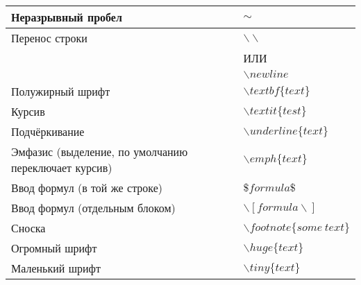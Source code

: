 \documentclass[12pt]{article}
\begin{document}
\begin{center}
\begin{tabular}{ || l | l || }
    Неразрывный пробел &
    $\sim$ \\ \hline

    Перенос строки &
    $\backslash \backslash$ \\ &
    ИЛИ \\ &
    $\backslash newline$ \\ \hline

    Полужирный шрифт &
    $\backslash textbf\{text\}$ \\ \hline

    Курсив &
    $\backslash textit\{test\}$ \\ \hline

    Подчёркивание &
    $\backslash underline\{text\}$ \\ \hline

    Эмфазис (выделение, по умолчанию переключает курсив) &
    $\backslash emph\{text\}$ \\ \hline

    Ввод формул (в той же строке) &
    $\$ formula \$$ \\ \hline

    Ввод формул (отдельным блоком) &
    $\backslash [ formula \backslash ]$ \\ \hline

    Сноска &
    $\backslash footnote\{some~text\}$ \\ \hline

    Огромный шрифт &
    $\backslash huge\{text\}$ \\ \hline

    Маленький шрифт &
    $\backslash tiny\{text\}$ \\ \hline

  \end{tabular}
\end{center}
\end{document}
